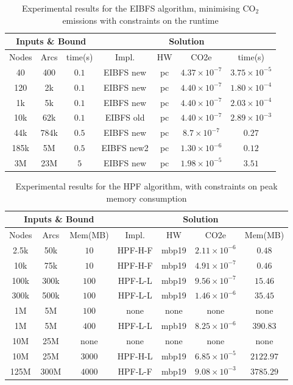 \documentclass[a4paper,singleside,12pt]{report} %
\begin{document}
\begin{table}[h!]
    \centering
    \begin{tabular}{|ccc|cccc|}
        \hline
        \multicolumn{3}{|c|}{Inputs \& Bound} & \multicolumn{4}{c|}{Solution} \\
        \hline
        Nodes & Arcs & time(s) & Impl. & HW & CO2e & time(s) \\
        \hline
        40 & 400 & $0.1$ & EIBFS new & pc & $4.37 \times 10^{-7}$ & $3.75 \times 10^{-5}$ \\
        120 & 2k & $0.1$ & EIBFS new & pc & $4.40 \times 10^{-7}$ & $1.80 \times 10^{-4}$ \\
        1k & 5k & $0.1$ & EIBFS new & pc & $4.40 \times 10^{-7}$ & $2.03 \times 10^{-4}$ \\
        10k & 62k & $0.1$ & EIBFS old & pc & $4.40 \times 10^{-7}$ & $2.89 \times 10^{-3}$ \\
        44k & 784k & $0.5$ & EIBFS new & pc & $8.7 \times 10^{-7}$ & $0.27$ \\
        185k & 5M & $0.5$ & EIBFS new2 & pc & $1.30 \times 10^{-6}$ & $0.12$ \\
        3M & 23M & $5$ & EIBFS new & pc & $1.98 \times 10^{-5}$& $3.51$ \\
        \hline
    \end{tabular}
    \caption{Experimental results for the EIBFS algorithm, minimising CO$_2$ emissions with constraints on the runtime}
    \label{tab:eibfs_results}
\end{table}

\begin{table}[h!]
    \centering
    \begin{tabular}{|ccc|cccc|}
        \hline
        \multicolumn{3}{|c|}{Inputs \& Bound} & \multicolumn{4}{c|}{Solution} \\
        \hline
        Nodes & Arcs & Mem(MB) & Impl. & HW & CO2e & Mem(MB) \\
        \hline
        2.5k & 50k & $10$ & HPF-H-F & mbp19 & $2.11 \times 10^{-6}$ & $0.48$ \\
        10k & 75k & $10$ & HPF-H-F & mbp19 & $4.91 \times 10^{-7}$ & $0.46$ \\
        100k & 300k & $100$ & HPF-L-L & mbp19 & $9.56 \times 10^{-7}$ & $15.46$ \\
        300k & 500k & $100$ & HPF-L-L & mbp19 & $1.46 \times 10^{-6}$ & $35.45$ \\
        1M & 5M & $100$ & none & none & none & none \\
        1M & 5M & $400$ & HPF-L-L & mpb19 & $8.25 \times 10^{-6}$ & $390.83$ \\
        10M & 25M & none & none & none & none & none \\
        10M & 25M & $3000$ & HPF-H-L & mbp19 & $6.85 \times 10^{-5}$ & $2122.97$ \\
        125M & 300M & $4000$ & HPF-L-F & mbp19 & $9.08 \times 10^{-3}$ & $3785.29$ \\
        \hline
    \end{tabular}
    \caption{Experimental results for the HPF algorithm, with constraints on peak memory consumption}
    \label{tab:hpf_results}
\end{table}
\end{document}
